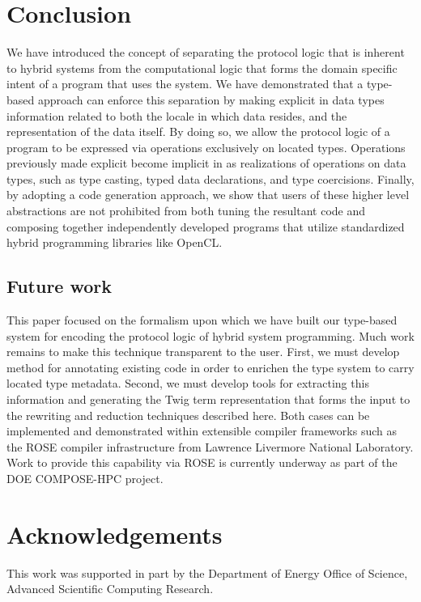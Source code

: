 
\section{Conclusion}

We have introduced the concept of separating the protocol logic that
is inherent to hybrid systems from the computational logic that forms the
domain specific intent of a program that uses the system.  We have 
demonstrated that a type-based approach can enforce this separation by
making explicit in data types information related to both the locale in which
data resides, and the representation of the data itself.  By doing so,
we allow the protocol logic of a program to be expressed via operations
exclusively on located types.  Operations previously made explicit become
implicit in as realizations of operations on data types, such as type
casting, typed data declarations, and type coercisions.  Finally, by
adopting a code generation approach, we show that users of these higher
level abstractions are not prohibited from both tuning the resultant code and
composing together independently developed programs that utilize standardized
hybrid programming libraries like OpenCL. 

\subsection{Future work}

This paper focused on the formalism upon which we have built our type-based
system for encoding the protocol logic of hybrid system programming.  Much
work remains to make this technique transparent to the user.  First, we must
develop method for annotating existing code in order to enrichen the type
system to carry located type metadata.  Second, we must develop tools for
extracting this information and generating the Twig term representation
that forms the input to the rewriting and reduction techniques described here.
Both cases can be implemented and demonstrated within extensible compiler
frameworks such as the ROSE compiler infrastructure from Lawrence Livermore
National Laboratory.  Work to provide this capability via ROSE is currently
underway as part of the DOE COMPOSE-HPC project.

\section{Acknowledgements}

This work was supported in part by the Department of Energy Office of Science,
Advanced Scientific Computing Research.

